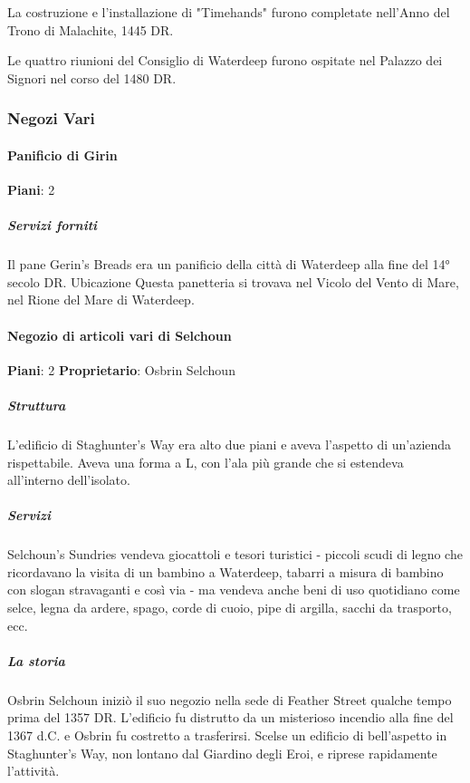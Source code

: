 \documentclass{article}
\begin{document}
                          La costruzione e l'installazione di "Timehands" furono completate nell'Anno del Trono di Malachite, 1445 DR.
                          
                          Le quattro riunioni del Consiglio di Waterdeep furono ospitate nel Palazzo dei Signori nel corso del 1480 DR.
                  
             \subsubsection{Negozi Vari}
              \paragraph{Panificio di Girin}
                  \textbf{Piani}: 2
                      \subparagraph{Servizi forniti}
                      Il pane
                      Gerin's Breads era un panificio della città di Waterdeep alla fine del 14° secolo DR.
                      Ubicazione
                      Questa panetteria si trovava nel Vicolo del Vento di Mare, nel Rione del Mare di Waterdeep.




              \paragraph{Negozio di articoli vari di Selchoun}
                  \textbf{Piani}: 2\newline
                  \textbf{Proprietario}: Osbrin Selchoun\newline
                                        \subparagraph{Struttura}
                  L'edificio di Staghunter's Way era alto due piani e aveva l'aspetto di un'azienda rispettabile. Aveva una forma a L, con l'ala più grande che si estendeva all'interno dell'isolato.

                                        \subparagraph{Servizi}
                  Selchoun's Sundries vendeva giocattoli e tesori turistici - piccoli scudi di legno che ricordavano la visita di un bambino a Waterdeep, tabarri a misura di bambino con slogan stravaganti e così via - ma vendeva anche beni di uso quotidiano come selce, legna da ardere, spago, corde di cuoio, pipe di argilla, sacchi da trasporto, ecc.

                                        \subparagraph{La storia}
                  Osbrin Selchoun iniziò il suo negozio nella sede di Feather Street qualche tempo prima del 1357 DR. L'edificio fu distrutto da un misterioso incendio alla fine del 1367 d.C. e Osbrin fu costretto a trasferirsi. Scelse un edificio di bell'aspetto in Staghunter's Way, non lontano dal Giardino degli Eroi, e riprese rapidamente l'attività.
\end{document}
